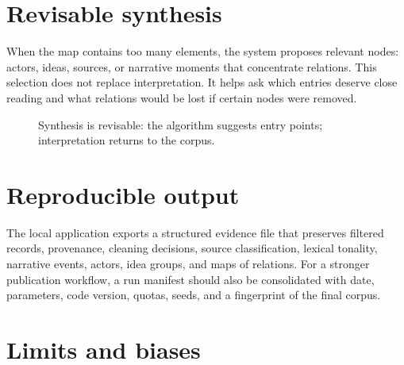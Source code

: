 \documentclass[11pt]{article}
\begin{document}
\section{Revisable synthesis}

When the map contains too many elements, the system proposes relevant nodes:
actors, ideas, sources, or narrative moments that concentrate relations. This
selection does not replace interpretation. It helps ask which entries deserve
close reading and what relations would be lost if certain nodes were removed.

\begin{figure}[H]
\centering
{}
\caption{Synthesis is revisable: the algorithm suggests entry points; interpretation returns to the corpus.}
\label{fig:synthesis-en}
\end{figure}

\section{Reproducible output}

The local application exports a structured evidence file that preserves filtered
records, provenance, cleaning decisions, source classification, lexical
tonality, narrative events, actors, idea groups, and maps of relations. For a
stronger publication workflow, a run manifest should also be consolidated with
date, parameters, code version, quotas, seeds, and a fingerprint of the final
corpus.

\section{Limits and biases}
\end{document}
